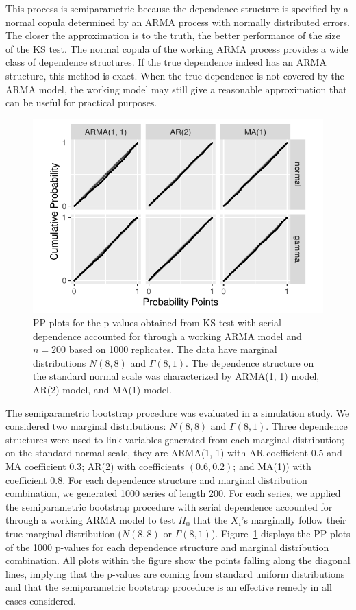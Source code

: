 \documentclass[12pt, letterpaper, titlepage]{article}
\begin{document}
This process is semiparametric because the dependence structure is specified by
a normal copula determined by an ARMA process with normally distributed errors.
The closer the approximation is to the truth, the better
performance of the size of the KS test. The normal copula of the working ARMA
process provides a wide class of dependence structures.
If the true dependence indeed has an ARMA structure, this method is exact. When
the true dependence is not covered by the ARMA model, the working model may 
still give a reasonable approximation that can
be useful for practical purposes. 

		
\begin{figure}[tbp]
  \centering
  \includegraphics[width=.75\textwidth]{pp_ss.pdf}
  \caption{PP-plots for the p-values obtained from KS test with serial
    dependence accounted for through a working ARMA model and $n = 200$ based on
    1000 replicates. The data have marginal distributions $N(8, 8)$ and
    $\Gamma(8, 1)$. The dependence structure on the standard normal scale was
    characterized by ARMA(1, 1) model, AR(2) model, and MA(1) model.
  }
  \label{fig:pp_ss}
\end{figure}


The semiparametric bootstrap procedure was evaluated in a simulation study. We
considered two marginal distributions: $N(8,8)$ and $\Gamma(8,1)$. Three
dependence structures were used to link variables generated from each marginal
distribution; on the standard normal scale, they are
ARMA(1, 1) with AR coefficient 0.5 and MA coefficient 0.3;
AR(2) with coefficients $(0.6, 0.2)$; and
MA(1)) with coefficient 0.8.
For each dependence structure and marginal distribution combination, we
generated 1000 series of length 200.  For each series, we applied the
semiparametric bootstrap procedure with serial
dependence accounted for through a working ARMA model to test $H_0$ that the 
$X_i$'s marginally follow their true marginal distribution ($N(8, 8)$ or 
$\Gamma(8,1)$). Figure~\ref{fig:pp_ss} displays the PP-plots of the 1000 
p-values for each dependence structure and marginal distribution combination.
All plots within the figure show the points falling along the diagonal lines, 
implying that the p-values are coming from standard uniform distributions and 
that the semiparametric bootstrap procedure is an effective remedy in all cases
considered.
\end{document}
